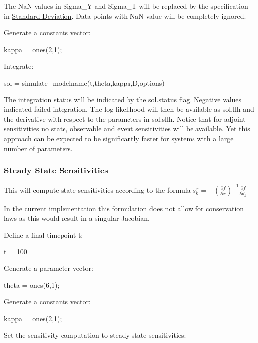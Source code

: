 The Na\+N values in Sigma\+\_\+\+Y and Sigma\+\_\+\+T will be replaced by the specification in \hyperlink{def_simu_std}{Standard Deviation}. Data points with Na\+N value will be completely ignored.

Generate a constants vector\+:


\begin{DoxyCode}
kappa = ones(2,1);
\end{DoxyCode}


Integrate\+:


\begin{DoxyCode}
sol = simulate\_modelname(t,theta,kappa,D,options)
\end{DoxyCode}


The integration status will be indicated by the sol.\+status flag. Negative values indicated failed integration. The log-\/likelihood will then be available as sol.\+llh and the derivative with respect to the parameters in sol.\+sllh. Notice that for adjoint sensitivities no state, observable and event sensitivities will be available. Yet this approach can be expected to be significantly faster for systems with a large number of parameters.\hypertarget{def_simu_steadystate}{}\subsubsection{Steady State Sensitivities}\label{def_simu_steadystate}
This will compute state sensitivities according to the formula $ s_k^x = -\left(\frac{\partial f}{\partial x} \right)^{-1}\frac{\partial f}{\partial \theta_k} $

In the current implementation this formulation does not allow for conservation laws as this would result in a singular Jacobian.

Define a final timepoint t\+:


\begin{DoxyCode}
t = 100
\end{DoxyCode}


Generate a parameter vector\+:


\begin{DoxyCode}
theta = ones(6,1);
\end{DoxyCode}


Generate a constants vector\+:


\begin{DoxyCode}
kappa = ones(2,1);
\end{DoxyCode}


Set the sensitivity computation to steady state sensitivities\+:



